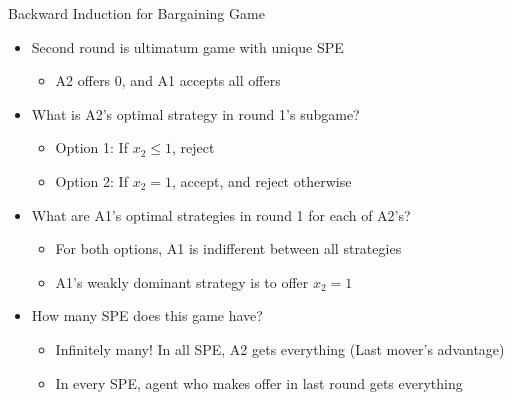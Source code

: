 \documentclass[11pt,aspectratio=169,handout]{beamer}
\begin{document}
  \begin{frame}{Backward Induction for Bargaining Game}
   \begin{itemize}[<+->]
   \setlength{\itemsep}{0.5em}
    \item Second round is ultimatum game with \alert{unique SPE}
    \begin{itemize}
     \item A2 offers $0$, and A1 accepts all offers 
    \end{itemize}
    \item What is A2's optimal strategy in round 1's subgame?
    \begin{itemize}
     \item \alert{Option 1}: If $x_2 \leq 1$, reject 
     \item \alert{Option 2}: If $x_2=1$, accept, and reject otherwise
    \end{itemize}
    \item What are A1's optimal strategies in round 1 for each of A2's?
    \begin{itemize}
     \item For both options, A1 is indifferent between all strategies
     \item A1's \alert{weakly dominant strategy} is to offer $x_2 = 1$
    \end{itemize}
    \item How many SPE does this game have?
    \begin{itemize}
     \item Infinitely many! In all SPE, A2 gets everything (\alert{Last mover's advantage})
     \item In every SPE, agent who makes offer in last round gets everything
    \end{itemize}
   \end{itemize}
  \end{frame}
\end{document}
